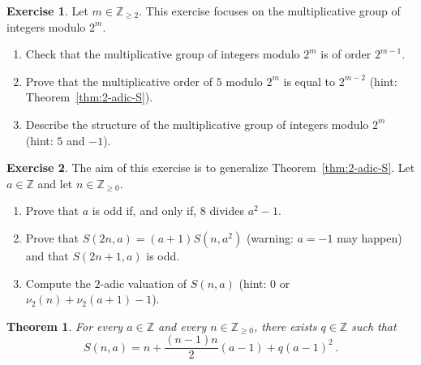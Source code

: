 \documentclass[12pt]{article}
\newcommand{\bZ}{\mathbb{Z}}
\newcommand{\bN}{\bZ_{\ge 0}}%
\newcommand{\bNdeux}{\bZ_{\ge 2}}
\newtheorem{theorem}{Theorem}
\theoremstyle{definition}
\newtheorem{exercise}{Exercise}
\begin{document}
\begin{exercise}
   Let $m \in \bNdeux$.
   This exercise focuses on the multiplicative group of integers modulo $2^m$.
   \begin{enumerate}
   \item Check that the multiplicative group of integers modulo $2^m$ is of order $2^{m - 1}$.
   \item Prove that the multiplicative order of $5$ modulo $2^m$ is equal to $2^{m - 2}$
     (hint: Theorem~\ref{thm:2-adic-S}).
   \item Describe the structure of the multiplicative group of integers modulo $2^m$ (hint: $5$ and $-1$).
 \end{enumerate}
\end{exercise}

\begin{exercise}
  The aim of this exercise is to generalize Theorem~\ref{thm:2-adic-S}.
  Let $a \in \bZ$ and let $n \in \bN$.
  \begin{enumerate}
  \item Prove that $a$ is odd if, and only if, $8$ divides $a^2 - 1$.
  \item Prove that $S(2 n, a) = (a + 1) S(n, a^2)$ (warning: $a = - 1$ may happen) and that $S(2n + 1, a)$ is odd. 
  \item Compute the $2$-adic valuation of $S(n, a)$  (hint: $0$ or $\nu_2(n) + \nu_2(a + 1) - 1$).
  \end{enumerate}
\end{exercise}

\begin{theorem} \label{thm:DL-Sn-am}
  For every $a \in \bZ$ and every $n \in \bN$, there exists $q \in \bZ$ such that 
  $$
  S(n, a) = n + \frac{(n - 1)n}{2}(a - 1) + q {(a - 1)}^2 \, .
  $$
 \end{theorem}
\end{document}
